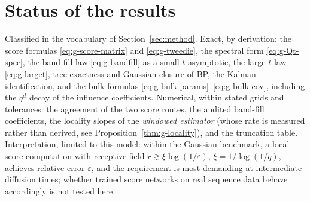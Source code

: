 \section{Status of the results}\label{sec:g-status}

Classified in the vocabulary of Section~\ref{sec:method}.
Exact, by derivation: the score formulas
\eqref{eq:g-score-matrix} and \eqref{eq:g-tweedie}, the spectral form
\eqref{eq:g-Qt-spec}, the band-fill law \eqref{eq:g-bandfill} as a
small-$t$ asymptotic, the large-$t$ law \eqref{eq:g-larget}, tree
exactness and Gaussian closure of BP, the Kalman identification, and the
bulk formulas \eqref{eq:g-bulk-params}--\eqref{eq:g-bulk-cov}, including
the $q^d$ decay of the influence coefficients. Numerical, within stated
grids and tolerances: the agreement of the two score routes, the audited
band-fill coefficients, the locality slopes of the \emph{windowed
estimator} (whose rate is measured rather than derived, see
Proposition~\ref{thm:g-locality}), and the truncation table. Interpretation, limited to
this model: within the Gaussian benchmark, a local score computation with
receptive field $r \gtrsim \xi \log(1/\varepsilon)$,
$\xi = 1/\log(1/q)$, achieves relative error $\varepsilon$, and the
requirement is most demanding at intermediate diffusion times; whether
trained score networks on real sequence data behave accordingly is not
tested here.
